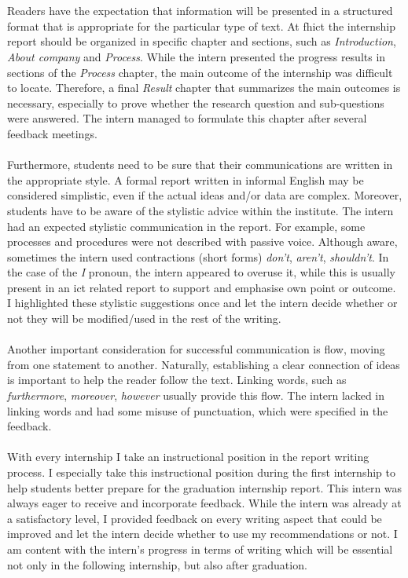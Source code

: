 \\\\
Readers have the expectation that information will be presented in a structured
format that is appropriate for the particular type of text. At \acrshort{fhict} the internship report should be organized in specific chapter and sections, such as \textit{Introduction}, \textit{About company} and \textit{Process}. While the intern presented the progress results in sections of the \textit{Process} chapter, the main outcome of the internship was difficult to locate. Therefore, a final \textit{Result} chapter that summarizes the main outcomes is necessary, especially to prove whether the research question and sub-questions were answered. The intern managed to formulate this chapter after several feedback meetings.
\\\\
Furthermore, students need to be sure that their communications are written in the appropriate style. 
A formal report written in informal English may be considered simplistic, even if the actual ideas and/or data are complex.
Moreover, students have to be aware of the stylistic advice within the institute.
The intern had an expected stylistic communication in the report.
For example, some processes and procedures were not described with passive voice. 
Although aware, sometimes the intern used contractions (short forms) \textit{don't}, \textit{aren't}, \textit{shouldn't}.
In the case of the \textit{I} pronoun, the intern appeared to overuse it, while this is usually present in an \acrshort{ict} related report to support and emphasise own point or outcome. I highlighted these stylistic suggestions once and let the intern decide whether or not they will be modified/used in the rest of the writing.
\\\\
Another important consideration for successful communication is flow,
moving from one statement to another. Naturally, establishing a
clear connection of ideas is important to help the reader follow the text. Linking words, such as \textit{furthermore}, \textit{moreover}, \textit{however} usually provide this flow. The intern lacked in linking words and had some misuse of punctuation, which were specified in the feedback.
\\\\
With every internship I take an instructional position in the report writing process. I especially take this instructional position during the first internship to help students better prepare for the graduation internship report. This intern was always eager to receive and incorporate feedback. While the intern was already at a satisfactory level, I provided feedback on every writing aspect that could be improved and let the intern decide whether to use my recommendations or not. I am content with the intern's progress in terms of writing which will be essential not only in the following internship, but also after graduation.






